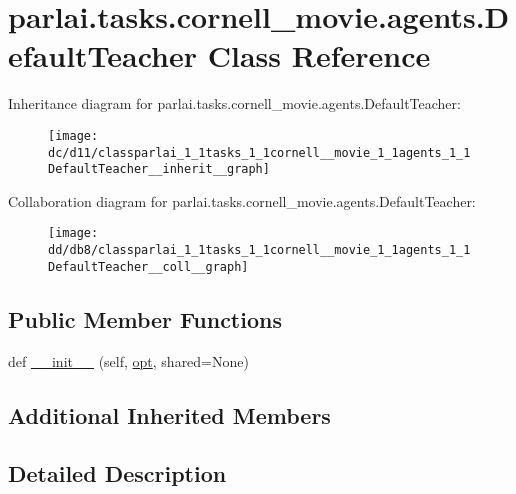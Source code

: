 \hypertarget{classparlai_1_1tasks_1_1cornell__movie_1_1agents_1_1DefaultTeacher}{}\section{parlai.\+tasks.\+cornell\+\_\+movie.\+agents.\+Default\+Teacher Class Reference}
\label{classparlai_1_1tasks_1_1cornell__movie_1_1agents_1_1DefaultTeacher}


Inheritance diagram for parlai.\+tasks.\+cornell\+\_\+movie.\+agents.\+Default\+Teacher\+:
\nopagebreak
\begin{figure}[H]
\begin{center}
\leavevmode
\texttt{[image: dc/d11/classparlai\_1\_1tasks\_1\_1cornell\_\_movie\_1\_1agents\_1\_1DefaultTeacher\_\_inherit\_\_graph]}
\end{center}
\end{figure}


Collaboration diagram for parlai.\+tasks.\+cornell\+\_\+movie.\+agents.\+Default\+Teacher\+:
\nopagebreak
\begin{figure}[H]
\begin{center}
\leavevmode
\texttt{[image: dd/db8/classparlai\_1\_1tasks\_1\_1cornell\_\_movie\_1\_1agents\_1\_1DefaultTeacher\_\_coll\_\_graph]}
\end{center}
\end{figure}
\subsection*{Public Member Functions}
\begin{DoxyCompactItemize}
\item 
def \hyperlink{classparlai_1_1tasks_1_1cornell__movie_1_1agents_1_1DefaultTeacher_a0e6994f898313bb5117f56fc4ca78bb7}{\+\_\+\+\_\+init\+\_\+\+\_\+} (self, \hyperlink{classparlai_1_1core_1_1teachers_1_1FbDialogTeacher_af7a9ec497b9cd0292d7b8fa220da7c28}{opt}, shared=None)
\end{DoxyCompactItemize}
\subsection*{Additional Inherited Members}


\subsection{Detailed Description}


